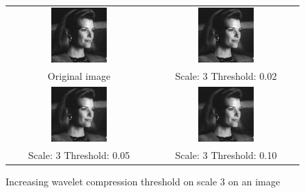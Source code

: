 \documentclass[a4paper]{article}
\begin{document}
\begin{enumerate}
\begin{figure}[H]
\centering
\begin{tabular}{cc}
 \includegraphics[width=0.4\textwidth]{../lab3ex3/tracy.png} & \includegraphics[width=0.4\textwidth]{../lab3ex3/l3t002.png} \\
 Original image & Scale: 3 Threshold: 0.02 \\
 \includegraphics[width=0.4\textwidth]{../lab3ex3/l3t005.png} & \includegraphics[width=0.4\textwidth]{../lab3ex3/l3t010.png}  \\
 Scale: 3 Threshold: 0.05 & Scale: 3 Threshold: 0.10 
\end{tabular}
\caption{Increasing wavelet compression threshold on scale 3 on an image}
\label{fig:scale3}
\end{figure}


\end{enumerate}
\end{document}
